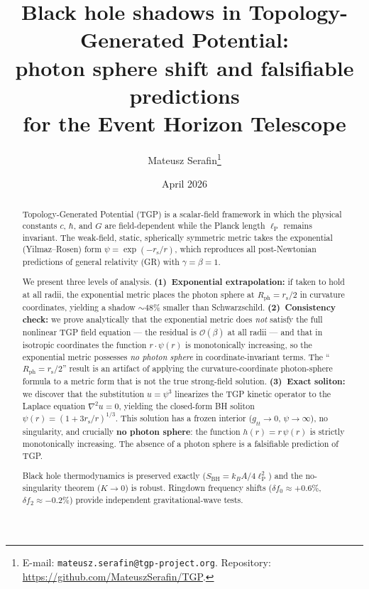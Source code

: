 \documentclass[11pt,a4paper]{article}
\theoremstyle{definition}
\theoremstyle{remark}
\newcommand{\lP}{\ell_{\mathrm{P}}}
\newcommand{\rs}{r_{\mathrm{s}}}
\begin{document}
\title{Black hole shadows in Topology-Generated Potential:\\
  photon sphere shift and falsifiable predictions\\
  for the Event Horizon Telescope}
\author{Mateusz Serafin\thanks{%
  E-mail: \texttt{mateusz.serafin@tgp-project.org}.
  Repository: \url{https://github.com/MateuszSerafin/TGP}.}}
\date{April 2026}
\maketitle

\begin{abstract}
Topology-Generated Potential (TGP) is a scalar-field framework in which
the physical constants $c$, $\hbar$, and $G$ are field-dependent while
the Planck length $\lP$ remains invariant.  The weak-field, static,
spherically symmetric metric takes the exponential (Yilmaz--Rosen) form
$\psi = \exp(-\rs/r)$, which reproduces all post-Newtonian predictions
of general relativity (GR) with $\gamma = \beta = 1$.

We present three levels of analysis.  \textbf{(1)~Exponential
extrapolation:} if taken to hold at all radii, the exponential metric
places the photon sphere at $R_{\mathrm{ph}} = \rs/2$ in curvature
coordinates, yielding a shadow $\sim 48\%$ smaller than Schwarzschild.
\textbf{(2)~Consistency check:} we prove analytically that the
exponential metric does \emph{not} satisfy the full nonlinear TGP field
equation --- the residual is $\mathcal{O}(\beta)$ at all radii ---
and that in isotropic coordinates the function $r\cdot\psi(r)$ is
monotonically increasing, so the exponential metric possesses
\emph{no photon sphere} in coordinate-invariant terms.  The
``$R_{\mathrm{ph}} = \rs/2$'' result is an artifact of applying the
curvature-coordinate photon-sphere formula to a metric form that is
not the true strong-field solution.  \textbf{(3)~Exact soliton:}
we discover that the substitution $u = \psi^3$ linearizes the TGP
kinetic operator to the Laplace equation $\nabla^2 u = 0$, yielding
the closed-form BH soliton
$\psi(r) = (1 + 3\rs/r)^{1/3}$.
This solution has a frozen interior ($g_{tt} \to 0$, $\psi \to \infty$),
no singularity, and crucially \textbf{no photon sphere}: the function
$h(r) = r\,\psi(r)$ is strictly monotonically increasing.
The absence of a photon sphere is a falsifiable prediction of TGP.

Black hole thermodynamics is preserved exactly
($S_{\mathrm{BH}} = k_B A / 4\lP^2$) and the no-singularity theorem
($K \to 0$) is robust.  Ringdown frequency shifts
($\delta f_0 \approx +0.6\%$, $\delta f_2 \approx -0.2\%$) provide
independent gravitational-wave tests.
\end{abstract}
\end{document}
